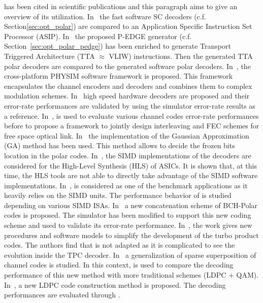 \AFFECT has been cited in scientific publications and this paragraph aims to
give an overview of its utilization. In~\cite{Leonardon2018a} the \AFFECT fast
software SC decoders (c.f. Section\ref{sec:opt_polar}) are compared to an
Application Specific Instruction Set Processor (ASIP). In~\cite{Leonardon2018b}
the proposed P-EDGE generator (c.f. Section~\ref{sec:opt_polar_pedge}) has been
enriched to generate Transport Triggered Architecture (TTA $\approx$ VLIW)
instructions. Then the generated TTA polar decoders are compared to the \AFFECT
generated software polar decoders. In~\cite{Florian2018}, the cross-platform
PHYSIM software framework is proposed. This framework encapsulates the \AFFECT
channel encoders and decoders and combines them to complex modulation schemes.
In~\cite{Pignoly2018,Ghanaatian2018,Wang2019} high speed hardware decoders are
proposed and their error-rate performances are validated by using the \AFFECT
simulator error-rate results as a reference. In~\cite{Poulenard2018}, \AFFECT is
used to evaluate various channel codes error-rate performances before to propose
a framework to jointly design interleaving and FEC schemes for free space
optical link. In~\cite{Cavatassi2019a,Cavatassi2019b} the \AFFECT implementation
of the Gaussian Approximation (GA) method has been used. This method allows to
decide the frozen bits location in the polar codes. In~\cite{Cenova2019}, the
SIMD implementations of the \AFFECT decoders are considered for the High-Level
Synthesis (HLS) of ASICs. It is shown that, at this time, the HLS tools are not
able to directly take advantage of the \Cxx SIMD software implementations.
In~\cite{Guermouche2019}, \AFFECT is considered as one of the benchmark
applications as it heavily relies on the SIMD units. The performance behavior of
\AFFECT is studied depending on various SIMD ISAs. In~\cite{Wang2019} a new
concatenation scheme of BCH-Polar codes is proposed. The \AFFECT simulator has
been modified to support this new coding scheme and used to validate its
error-rate performance. In~\cite{Krainyk2019}, the work gives new procedures and
software models to simplify the development of the turbo product codes. The
authors find that \AFFECT is not adapted as it is complicated to see the
evolution inside the TPC decoder. In~\cite{Hsieh2020,Rush2020} a generalization
of sparse superposition of channel codes is studied. In this context, \AFFECT is
used to compare the decoding performance of this new method with more
traditional schemes (LDPC + QAM). In~\cite{Tasdighi2020}, a new LDPC code
construction method is proposed. The decoding performances are evaluated through
\AFFECT.

